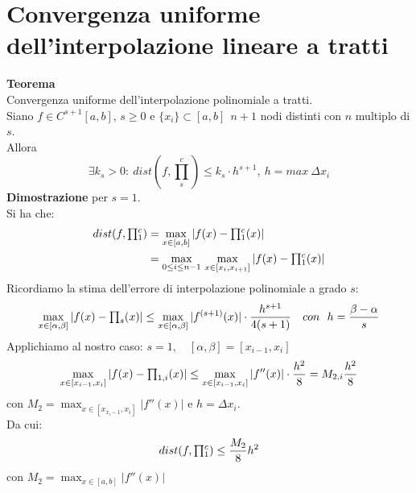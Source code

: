 \section{Convergenza uniforme dell'interpolazione lineare a tratti}
\textbf{Teorema}\\
Convergenza uniforme dell'interpolazione polinomiale a tratti.\\
Siano $f\in C^{s+1}[a,b]$, $s\ge0$ e $\{x_i\}\subset[a,b] \ \ n+1$ nodi distinti con $n$ multiplo di $s$.\\
Allora 
\[
\exists k_s > 0: \ dist(f, \prod_s^c) \leq k_s \cdot h^{s+1}, \ h = max \ \Delta x_i
\]
\textbf{Dimostrazione} per $s=1$.\\
Si ha che:
\[ \begin{split}
dist(f, \begin{matrix}\prod\end{matrix}_{1}^{c}) & = \max_{x \in [a,b]} |f(x) - \begin{matrix}\prod\end{matrix}_{1}^{c} (x) | \\
& = \max_{0 \le i \le n-1}\, \max_{x \in [x_i, x_{i+1}]} |f(x) - \begin{matrix}\prod\end{matrix}_{1}^{c} (x) |
\end{split} \]
Ricordiamo la stima dell'errore di interpolazione polinomiale a grado $s$:
\[\max_{x\in [\alpha , \beta]}|f(x) - \inter_{s}^{}(x)| \le \max_{x\in [\alpha , \beta]}|f^{(s+1)}(x)|\cdot\frac{h^{s+1}}{4(s+1)} \quad con \ \ h=\frac{\beta-\alpha}{s} \]
Applichiamo al nostro caso: $s=1, \quad [\alpha,\beta]=[x_{i-1},x_i]$ 
\[\max_{x\in [x_{i-1},x_i]}|f(x) - \begin{matrix}\prod\end{matrix}_{1,i}^{}(x)| \le \max_{x\in [x_{i-1},x_i]}|f''(x)|\cdot\frac{h^2}{8} = M_{2,i} \frac{h^2}{8} \]
con $M_2 = \max_{x\in[x_{x_i-1},x_i]} |f''(x)|$ e $h=\Delta x_i$.\\
Da cui:
\[
dist(f, \begin{matrix}\prod\end{matrix}_{1}^{c}) \le \frac{M_2}{8}h^2 \]
con $M_2 = \max_{x\in[a,b]} |f''(x)|$